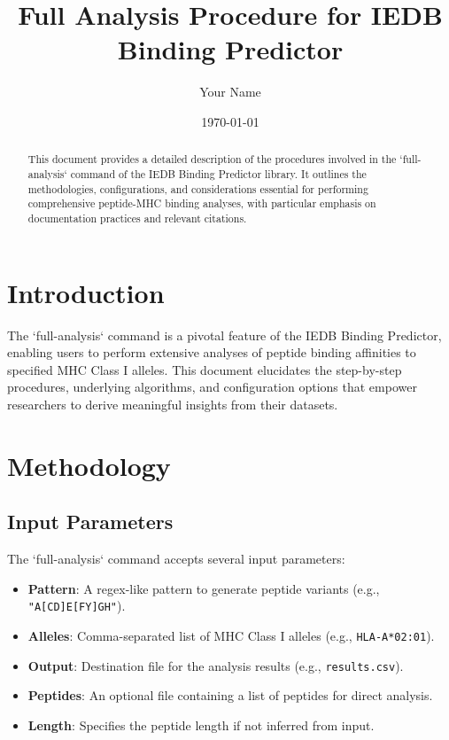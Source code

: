 \documentclass{article}
\title{Full Analysis Procedure for IEDB Binding Predictor}
\author{Your Name}
\date{\today}
\begin{document}
\maketitle

\begin{abstract}
This document provides a detailed description of the procedures involved in the `full-analysis` command of the IEDB Binding Predictor library. It outlines the methodologies, configurations, and considerations essential for performing comprehensive peptide-MHC binding analyses, with particular emphasis on documentation practices and relevant citations.
\end{abstract}

\section{Introduction}
The `full-analysis` command is a pivotal feature of the IEDB Binding Predictor, enabling users to perform extensive analyses of peptide binding affinities to specified MHC Class I alleles. This document elucidates the step-by-step procedures, underlying algorithms, and configuration options that empower researchers to derive meaningful insights from their datasets.

\section{Methodology}

\subsection{Input Parameters}
The `full-analysis` command accepts several input parameters:
\begin{itemize}
    \item \textbf{Pattern}: A regex-like pattern to generate peptide variants (e.g., \texttt{"A[CD]E[FY]GH"}).
    \item \textbf{Alleles}: Comma-separated list of MHC Class I alleles (e.g., \texttt{HLA-A*02:01}).
    \item \textbf{Output}: Destination file for the analysis results (e.g., \texttt{results.csv}).
    \item \textbf{Peptides}: An optional file containing a list of peptides for direct analysis.
    \item \textbf{Length}: Specifies the peptide length if not inferred from input.
\end{itemize}
\end{document}
